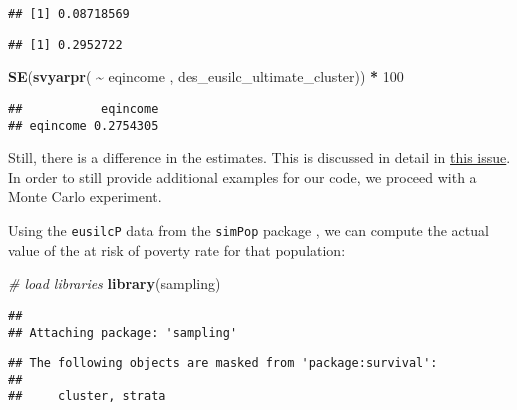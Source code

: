\documentclass[
]{book}
\newenvironment{Shaded}{\begin{snugshade}}{\end{snugshade}}
\newcommand{\CommentTok}[1]{\textcolor[rgb]{0.56,0.35,0.01}{\textit{#1}}}
\newcommand{\DecValTok}[1]{\textcolor[rgb]{0.00,0.00,0.81}{#1}}
\newcommand{\FunctionTok}[1]{\textcolor[rgb]{0.13,0.29,0.53}{\textbf{#1}}}
\newcommand{\NormalTok}[1]{#1}
\newcommand{\SpecialCharTok}[1]{\textcolor[rgb]{0.81,0.36,0.00}{\textbf{#1}}}
\begin{document}
\begin{verbatim}
## [1] 0.08718569
\end{verbatim}

\begin{Shaded}
\end{Shaded}

\begin{verbatim}
## [1] 0.2952722
\end{verbatim}

\begin{Shaded}
\begin{Highlighting}[]
\FunctionTok{SE}\NormalTok{(}\FunctionTok{svyarpr}\NormalTok{( }\SpecialCharTok{\textasciitilde{}}\NormalTok{ eqincome , des\_eusilc\_ultimate\_cluster)) }\SpecialCharTok{*} \DecValTok{100}
\end{Highlighting}
\end{Shaded}

\begin{verbatim}
##           eqincome
## eqincome 0.2754305
\end{verbatim}

Still, there is a difference in the estimates. This is discussed in detail in \href{https://github.com/ajdamico/convey/issues/372}{this issue}.
In order to still provide additional examples for our code, we proceed with a Monte Carlo experiment.

Using the \texttt{eusilcP} data from the \texttt{simPop} package \autocite{R-simPop}, we can compute the actual value of the at risk of poverty rate for that population:

\begin{Shaded}
\begin{Highlighting}[]
\CommentTok{\# load libraries}
\FunctionTok{library}\NormalTok{(sampling)}
\end{Highlighting}
\end{Shaded}

\begin{verbatim}
## 
## Attaching package: 'sampling'
\end{verbatim}

\begin{verbatim}
## The following objects are masked from 'package:survival':
## 
##     cluster, strata
\end{verbatim}
\end{document}

